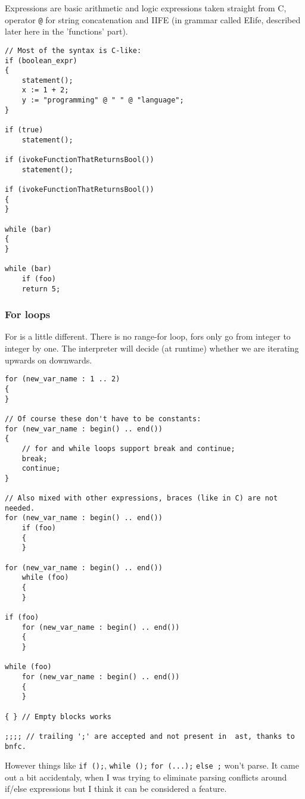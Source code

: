 \documentclass[11pt]{article}
\begin{document}
Expressions are basic arithmetic and logic expressions taken straight from C,
operator \texttt{@} for string concatenation and IIFE (in grammar called EIife,
described later here in the 'functions' part).

\begin{verbatim}
// Most of the syntax is C-like:
if (boolean_expr)
{
    statement();
    x := 1 + 2;
    y := "programming" @ " " @ "language";
}

if (true)
    statement();

if (ivokeFunctionThatReturnsBool())
    statement();

if (ivokeFunctionThatReturnsBool())
{
}

while (bar)
{
}

while (bar)
    if (foo)
	return 5;
\end{verbatim}

\subsubsection*{For loops}
\label{sec:org7984c57}
For is a little different. There is no range-for loop, fors only go from integer
to integer by one. The interpreter will decide (at runtime) whether we are
iterating upwards on downwards.

\begin{verbatim}
for (new_var_name : 1 .. 2)
{
}

// Of course these don't have to be constants:
for (new_var_name : begin() .. end())
{
    // for and while loops support break and continue;
    break;
    continue;
}

// Also mixed with other expressions, braces (like in C) are not needed.
for (new_var_name : begin() .. end())
    if (foo)
    {
    }

for (new_var_name : begin() .. end())
    while (foo)
    {
    }

if (foo)
    for (new_var_name : begin() .. end())
    {
    }

while (foo)
    for (new_var_name : begin() .. end())
    {
    }

{ } // Empty blocks works

;;;; // trailing ';' are accepted and not present in  ast, thanks to bnfc.
\end{verbatim}

However things like \texttt{if ();}, \texttt{while ();} \texttt{for (...);}
\texttt{else ;} won't parse. It came out a bit accidentaly, when I was trying to
eliminate parsing conflicts around if/else expressions but I think it can be
considered a feature.
\end{document}
